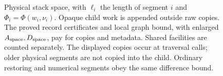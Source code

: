 \begin{figure}[t]
\caption{Physical stack space, with $\ell_i$ the length of segment $i$
and $\Phi_i=\Phi(w_i,\nu_i)$.  Opaque child work is appended outside raw
copies.  The proved record certificates and local graph bound, with
enlarged $A_{\rm space},D_{\rm space}$, pay for copies and metadata.  Shared facilities are
counted separately.  The displayed copies occur at traversal calls;
older physical segments are not copied into the child.  Ordinary
restoring and numerical segments obey the same difference bound.}
\label{fig:ctrl-space}
\end{figure}
